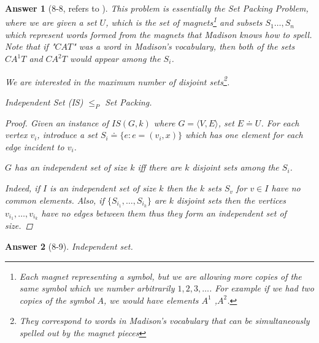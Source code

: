 \documentclass[11pt]{article}
\theoremstyle{numberplain}
\theoremstyle{nonumberplain}
\newtheorem{proof}{Proof}
\newtheorem{ans}{Answer}
\newcommand{\0}{{\mathbf{0}}}
\begin{document}
\begin{ans}[8-8, refers to \cite{coursehero8_8}] This problem is essentially the Set Packing Problem, where we are given a set  $U$, which is the set of magnets\footnote{Each magnet representing a symbol, but we are allowing more copies of  the same symbol which we number arbitrarily $1,2,3,\ldots$. For example if we had two copies of  the symbol $A$, we would have elements $A^1$ ,$A^2$.} and subsets $S_1\ldots,S_n$  which represent words formed from the magnets that Madison knows how to spell. Note that if "$CAT$" was a word  in Madison’s vocabulary, then both of the sets $CA^1  T$ and $CA^2T$ would appear among the $S_i$.

 We are interested in the maximum number of disjoint sets\footnote{They correspond to words in  Madison’s vocabulary that can be simultaneously spelled out by the magnet pieces}.  \par 
 \begin{State}[Claim 1]
Independent Set (IS) $\leq_P$ Set Packing.
\end{State}
 \begin{proof} Given an instance of $IS(G,k)$ where $G=\langle V,E\rangle$, set $E \doteq U$. For each vertex $v_i$, introduce a set  $S_i\doteq \{  e: e  = (  v_i  ,x  )  \}$ which  has one element for each edge incident to $v_i$. 
\begin{State}[Claim 2]
$G$ has an independent set of size $k$ iff there are $k$ disjoint sets among the $S_i$.
\end{State}
 Indeed, if $I$ is an independent set of size $k$ then  the $k$ sets $S_v$ for $v \in I$ have no common elements. Also, if $\{  S_{i_1}  ,\ldots ,S_{i_k} \}$  are $k$ disjoint sets then the vertices  $v_{i_1}  ,\ldots ,v_{i_k}$  have no edges between them thus they form an independent set of size.
  \end{proof}
\end{ans}

\begin{ans}[8-9] Independent set.
\end{ans}
\end{document}
